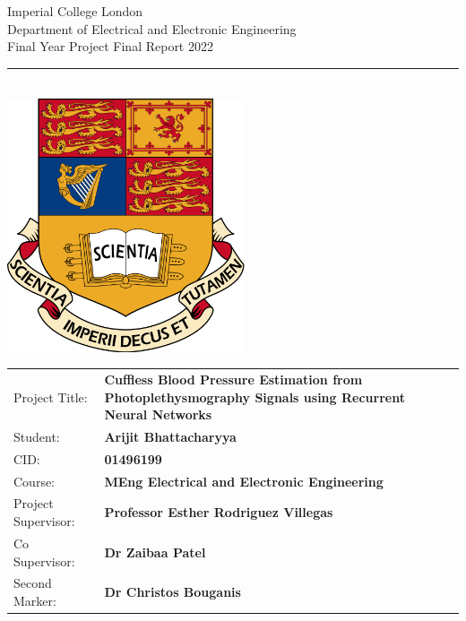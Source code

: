 \documentclass[12pt, a4paper,dvipsnames]{article}
\begin{document}
\thispagestyle{empty}

\begin{titlepage}
\setlength{\parindent}{0pt}
\setlength{\parskip}{0pt}
{
    \Large
    \raggedright
    Imperial College London\\[17pt]
    Department of Electrical and Electronic Engineering\\[17pt]
    Final Year Project Final Report 2022\\[17pt]
}

\rule{\columnwidth}{3pt}
\vfill
    \begin{center}
    \quad\\[1.1cm]
    \includegraphics[width=7cm]{logo.png}\\[1cm]
    \end{center}\vfill
\setlength{\tabcolsep}{0pt}

\begin{tabular}{p{40mm}p{\dimexpr\columnwidth-40mm}}
    Project Title: & \textbf{Cuffless Blood Pressure Estimation from Photoplethysmography Signals using Recurrent Neural Networks
    } \\[12pt]
    Student: & \textbf{Arijit Bhattacharyya} \\[12pt]
    CID: & \textbf{01496199} \\[12pt]
    Course: & \textbf{MEng Electrical and Electronic Engineering} \\[12pt]
    Project Supervisor: & \textbf{Professor Esther Rodriguez Villegas} \\[12pt]
    Co Supervisor: & \textbf{Dr Zaibaa Patel} \\[12pt]
    Second Marker: & \textbf{Dr Christos Bouganis} \\[12pt]
\end{tabular}
\end{titlepage}
\end{document}

